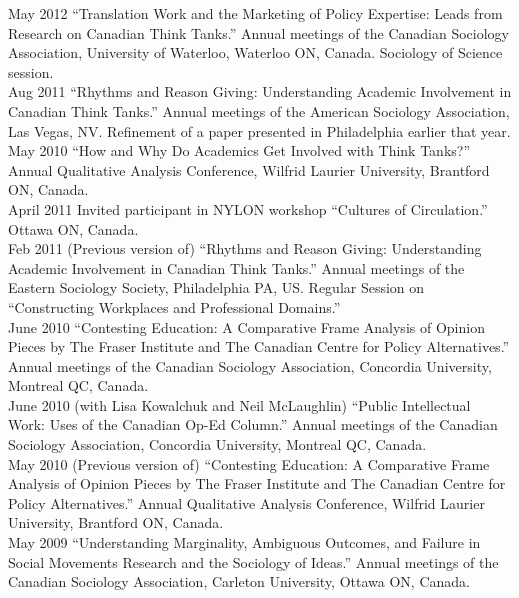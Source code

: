 \documentclass[11pt,usenames,dvipsnames]{article}
\begin{document}
\ind May 2012 ``Translation Work and the Marketing of Policy Expertise: Leads from Research on Canadian Think Tanks.'' Annual meetings of the Canadian Sociology Association, University of Waterloo, Waterloo ON, Canada. Sociology of Science session.\\

\ind Aug 2011 ``Rhythms and Reason Giving: Understanding Academic Involvement in Canadian Think Tanks.'' Annual meetings of the American Sociology Association, Las Vegas, NV. Refinement of a paper presented in Philadelphia earlier that year. \\

\ind May 2010 ``How and Why Do Academics Get Involved with Think Tanks?'' Annual Qualitative Analysis Conference, Wilfrid Laurier University, Brantford ON, Canada.\\

\ind April 2011 Invited participant in NYLON workshop ``Cultures of Circulation.'' Ottawa ON, Canada.\\

\ind Feb 2011 (Previous version of) ``Rhythms and Reason Giving: Understanding Academic Involvement in Canadian Think Tanks.'' Annual meetings of the Eastern Sociology Society, Philadelphia PA, US. Regular Session on ``Constructing Workplaces and Professional Domains.''\\

\ind June 2010 ``Contesting Education: A Comparative Frame Analysis of Opinion Pieces by The Fraser Institute and The Canadian Centre for Policy Alternatives.'' Annual meetings  of the Canadian Sociology Association, Concordia University, Montreal QC, Canada.\\

\ind June 2010 (with Lisa Kowalchuk and Neil McLaughlin) ``Public Intellectual Work: Uses of the Canadian Op-Ed Column.'' Annual meetings of the Canadian Sociology Association, Concordia University, Montreal QC, Canada.\\

\ind May 2010 (Previous version of) ``Contesting Education: A Comparative Frame Analysis of Opinion Pieces by The Fraser Institute and The Canadian Centre for Policy Alternatives.'' Annual Qualitative Analysis Conference, Wilfrid Laurier University, Brantford ON, Canada.\\

\ind May 2009 ``Understanding Marginality, Ambiguous Outcomes, and Failure in Social Movements Research and the Sociology of Ideas.'' Annual meetings of the Canadian Sociology Association, Carleton University, Ottawa ON, Canada.\\
\end{document}
